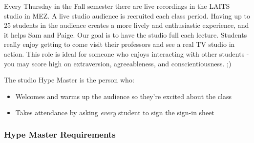 \documentclass[
]{article}
\providecommand{\tightlist}{%
  \setlength{\itemsep}{0pt}\setlength{\parskip}{0pt}}
\begin{document}
Every Thursday in the Fall semester there are live recordings in the LAITS studio in MEZ. A live studio audience is recruited each class period. Having up to 25 students in the audience creates a more lively and enthusiastic experience, and it helps Sam and Paige. Our goal is to have the studio full each lecture. Students really enjoy getting to come visit their professors and see a real TV studio in action. This role is ideal for someone who enjoys interacting with other students - you may score high on extraversion, agreeableness, and conscientiousness. ;)

The studio Hype Master is the person who:

\begin{itemize}
\tightlist
\item
  Welcomes and warms up the audience so they're excited about the class
\item
  Takes attendance by asking \emph{every} student to sign the sign-in sheet
\end{itemize}

\hypertarget{hype-master-requirements}{%
\subsubsection{Hype Master Requirements}\label{hype-master-requirements}}
\end{document}
